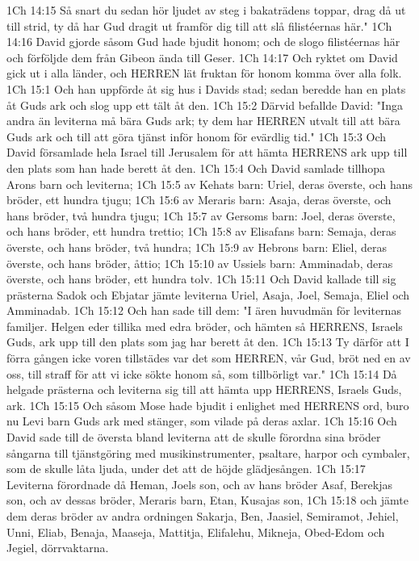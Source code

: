 1Ch 14:15  Så snart du sedan hör ljudet av steg i bakaträdens toppar, drag då ut till strid, ty då har Gud dragit ut framför dig till att slå filistéernas här."
1Ch 14:16  David gjorde såsom Gud hade bjudit honom; och de slogo filistéernas här och förföljde dem från Gibeon ända till Geser.
1Ch 14:17  Och ryktet om David gick ut i alla länder, och HERREN lät fruktan för honom komma över alla folk.
1Ch 15:1  Och han uppförde åt sig hus i Davids stad; sedan beredde han en plats åt Guds ark och slog upp ett tält åt den.
1Ch 15:2  Därvid befallde David: "Inga andra än leviterna må bära Guds ark; ty dem har HERREN utvalt till att bära Guds ark och till att göra tjänst inför honom för evärdlig tid."
1Ch 15:3  Och David församlade hela Israel till Jerusalem för att hämta HERRENS ark upp till den plats som han hade berett åt den.
1Ch 15:4  Och David samlade tillhopa Arons barn och leviterna;
1Ch 15:5  av Kehats barn: Uriel, deras överste, och hans bröder, ett hundra tjugu;
1Ch 15:6  av Meraris barn: Asaja, deras överste, och hans bröder, två hundra tjugu;
1Ch 15:7  av Gersoms barn: Joel, deras överste, och hans bröder, ett hundra trettio;
1Ch 15:8  av Elisafans barn: Semaja, deras överste, och hans bröder, två hundra;
1Ch 15:9  av Hebrons barn: Eliel, deras överste, och hans bröder, åttio;
1Ch 15:10  av Ussiels barn: Amminadab, deras överste, och hans bröder, ett hundra tolv.
1Ch 15:11  Och David kallade till sig prästerna Sadok och Ebjatar jämte leviterna Uriel, Asaja, Joel, Semaja, Eliel och Amminadab.
1Ch 15:12  Och han sade till dem: "I ären huvudmän för leviternas familjer. Helgen eder tillika med edra bröder, och hämten så HERRENS, Israels Guds, ark upp till den plats som jag har berett åt den.
1Ch 15:13  Ty därför att I förra gången icke voren tillstädes var det som HERREN, vår Gud, bröt ned en av oss, till straff för att vi icke sökte honom så, som tillbörligt var."
1Ch 15:14  Då helgade prästerna och leviterna sig till att hämta upp HERRENS, Israels Guds, ark.
1Ch 15:15  Och såsom Mose hade bjudit i enlighet med HERRENS ord, buro nu Levi barn Guds ark med stänger, som vilade på deras axlar.
1Ch 15:16  Och David sade till de översta bland leviterna att de skulle förordna sina bröder sångarna till tjänstgöring med musikinstrumenter, psaltare, harpor och cymbaler, som de skulle låta ljuda, under det att de höjde glädjesången.
1Ch 15:17  Leviterna förordnade då Heman, Joels son, och av hans bröder Asaf, Berekjas son, och av dessas bröder, Meraris barn, Etan, Kusajas son,
1Ch 15:18  och jämte dem deras bröder av andra ordningen Sakarja, Ben, Jaasiel, Semiramot, Jehiel, Unni, Eliab, Benaja, Maaseja, Mattitja, Elifalehu, Mikneja, Obed-Edom och Jegiel, dörrvaktarna.
